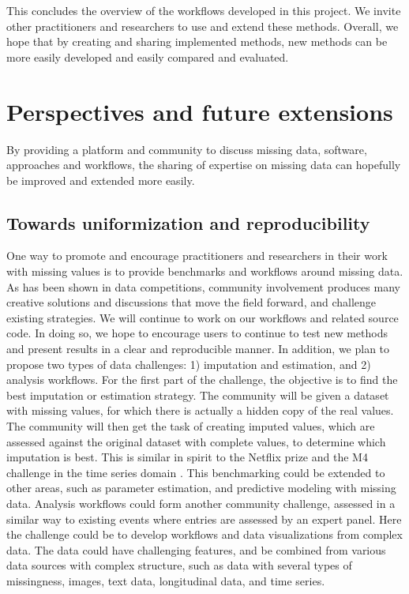 This concludes the overview of the workflows developed in this project. We invite other practitioners and researchers to use and extend these methods. Overall, we hope that by creating and sharing implemented methods, new methods can be more easily developed and easily compared and evaluated. 


\section{Perspectives and future extensions}

By providing a platform and community to discuss missing data, software, approaches and workflows, the sharing of expertise on missing data can hopefully be improved and extended more easily.

\label{sec:conc}

\subsection{Towards uniformization and reproducibility}

One way to promote and encourage practitioners and researchers in their work with missing values is to provide benchmarks and workflows around missing data. As has been shown in data competitions, community involvement produces many creative solutions and discussions that move the field forward, and challenge existing strategies.
We will continue to work on our workflows and related source code. In doing so, we hope to encourage users to continue to test new methods and present results in a clear and reproducible manner.
In addition, we plan to propose two types of data challenges: 1) imputation and estimation, and 2) analysis workflows.
For the first part of the challenge, the objective is to find the best imputation or estimation strategy. The community will be given a dataset with missing values, for which there is actually a hidden copy of the real values. The community will then get the task of creating imputed values, which are assessed against the original dataset with complete values, to determine which imputation is best. This is similar in spirit to the Netflix prize \citep{Bennett2007} and the M4 challenge in the time series domain \citep{Makridakis2018}. This benchmarking could be extended to other areas, such as parameter estimation, and predictive modeling with missing data.
%
Analysis workflows could form another community challenge, assessed in a similar way to existing  events where entries are assessed by an expert panel.
Here the challenge could be to develop workflows and data visualizations from complex data. The data could have challenging features, and be combined from various data sources with complex structure, such as data with several types of missingness, images, text data, longitudinal data, and time series.

